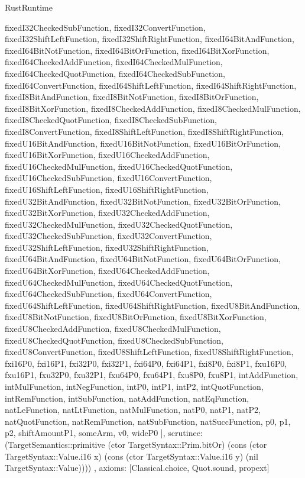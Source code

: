\begin{lexlean}{RustRuntime}
\begin{semanticmodule}
{{      fixedI32CheckedSubFunction,
      fixedI32ConvertFunction,
      fixedI32ShiftLeftFunction,
      fixedI32ShiftRightFunction,
      fixedI64BitAndFunction,
      fixedI64BitNotFunction,
      fixedI64BitOrFunction,
      fixedI64BitXorFunction,
      fixedI64CheckedAddFunction,
      fixedI64CheckedMulFunction,
      fixedI64CheckedQuotFunction,
      fixedI64CheckedSubFunction,
      fixedI64ConvertFunction,
      fixedI64ShiftLeftFunction,
      fixedI64ShiftRightFunction,
      fixedI8BitAndFunction,
      fixedI8BitNotFunction,
      fixedI8BitOrFunction,
      fixedI8BitXorFunction,
      fixedI8CheckedAddFunction,
      fixedI8CheckedMulFunction,
      fixedI8CheckedQuotFunction,
      fixedI8CheckedSubFunction,
      fixedI8ConvertFunction,
      fixedI8ShiftLeftFunction,
      fixedI8ShiftRightFunction,
      fixedU16BitAndFunction,
      fixedU16BitNotFunction,
      fixedU16BitOrFunction,
      fixedU16BitXorFunction,
      fixedU16CheckedAddFunction,
      fixedU16CheckedMulFunction,
      fixedU16CheckedQuotFunction,
      fixedU16CheckedSubFunction,
      fixedU16ConvertFunction,
      fixedU16ShiftLeftFunction,
      fixedU16ShiftRightFunction,
      fixedU32BitAndFunction,
      fixedU32BitNotFunction,
      fixedU32BitOrFunction,
      fixedU32BitXorFunction,
      fixedU32CheckedAddFunction,
      fixedU32CheckedMulFunction,
      fixedU32CheckedQuotFunction,
      fixedU32CheckedSubFunction,
      fixedU32ConvertFunction,
      fixedU32ShiftLeftFunction,
      fixedU32ShiftRightFunction,
      fixedU64BitAndFunction,
      fixedU64BitNotFunction,
      fixedU64BitOrFunction,
      fixedU64BitXorFunction,
      fixedU64CheckedAddFunction,
      fixedU64CheckedMulFunction,
      fixedU64CheckedQuotFunction,
      fixedU64CheckedSubFunction,
      fixedU64ConvertFunction,
      fixedU64ShiftLeftFunction,
      fixedU64ShiftRightFunction,
      fixedU8BitAndFunction,
      fixedU8BitNotFunction,
      fixedU8BitOrFunction,
      fixedU8BitXorFunction,
      fixedU8CheckedAddFunction,
      fixedU8CheckedMulFunction,
      fixedU8CheckedQuotFunction,
      fixedU8CheckedSubFunction,
      fixedU8ConvertFunction,
      fixedU8ShiftLeftFunction,
      fixedU8ShiftRightFunction,
      fxi16P0,
      fxi16P1,
      fxi32P0,
      fxi32P1,
      fxi64P0,
      fxi64P1,
      fxi8P0,
      fxi8P1,
      fxu16P0,
      fxu16P1,
      fxu32P0,
      fxu32P1,
      fxu64P0,
      fxu64P1,
      fxu8P0,
      fxu8P1,
      intAddFunction,
      intMulFunction,
      intNegFunction,
      intP0,
      intP1,
      intP2,
      intQuotFunction,
      intRemFunction,
      intSubFunction,
      natAddFunction,
      natEqFunction,
      natLeFunction,
      natLtFunction,
      natMulFunction,
      natP0,
      natP1,
      natP2,
      natQuotFunction,
      natRemFunction,
      natSubFunction,
      natSuccFunction,
      p0,
      p1,
      p2,
      shiftAmountP1,
      someArm,
      v0,
      wideP0
    ],
    scrutinee: (TargetSemantics::primitive (ctor TargetSyntax::Prim.bitOr) (cons (ctor TargetSyntax::Value.i16 x) (cons (ctor TargetSyntax::Value.i16 y) (nil TargetSyntax::Value))))
  },
  axioms: [Classical.choice, Quot.sound, propext]
}


\end{semanticmodule}
\end{lexlean}
